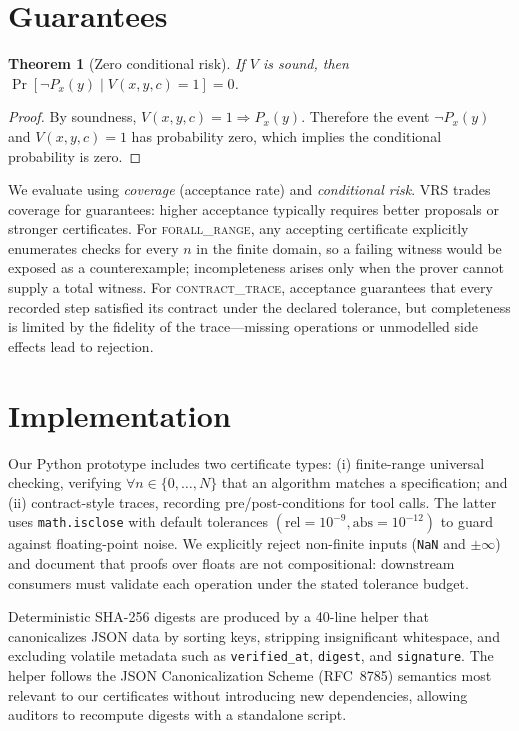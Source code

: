 \documentclass[11pt]{article}
\newtheorem{theorem}{Theorem}
\begin{document}
\section{Guarantees}
\begin{theorem}[Zero conditional risk]
If $V$ is sound, then $\Pr[\neg P_x(y)\mid V(x,y,c)=1]=0$.
\end{theorem}
\begin{proof}
By soundness, $V(x,y,c)=1 \Rightarrow P_x(y)$. Therefore the event $\neg P_x(y)$ and $V(x,y,c)=1$ has probability zero, which implies the conditional probability is zero.
\end{proof}
We evaluate using \emph{coverage} (acceptance rate) and \emph{conditional risk}. VRS trades coverage for guarantees: higher acceptance typically requires better proposals or stronger certificates. For \textsc{forall\_range}, any accepting certificate explicitly enumerates checks for every $n$ in the finite domain, so a failing witness would be exposed as a counterexample; incompleteness arises only when the prover cannot supply a total witness. For \textsc{contract\_trace}, acceptance guarantees that every recorded step satisfied its contract under the declared tolerance, but completeness is limited by the fidelity of the trace---missing operations or unmodelled side effects lead to rejection.

\section{Implementation}
Our Python prototype includes two certificate types: (i) finite-range universal checking, verifying $\forall n\in\{0,\dots,N\}$ that an algorithm matches a specification; and (ii) contract-style traces, recording pre/post-conditions for tool calls. The latter uses \texttt{math.isclose} with default tolerances $(\text{rel}=10^{-9}, \text{abs}=10^{-12})$ to guard against floating-point noise. We explicitly reject non-finite inputs (\texttt{NaN} and $\pm\infty$) and document that proofs over floats are not compositional: downstream consumers must validate each operation under the stated tolerance budget.

Deterministic SHA-256 digests are produced by a 40-line helper that canonicalizes JSON data by sorting keys, stripping insignificant whitespace, and excluding volatile metadata such as \texttt{verified\_at}, \texttt{digest}, and \texttt{signature}. The helper follows the JSON Canonicalization Scheme (RFC~8785) semantics most relevant to our certificates without introducing new dependencies, allowing auditors to recompute digests with a standalone script.
\end{document}
